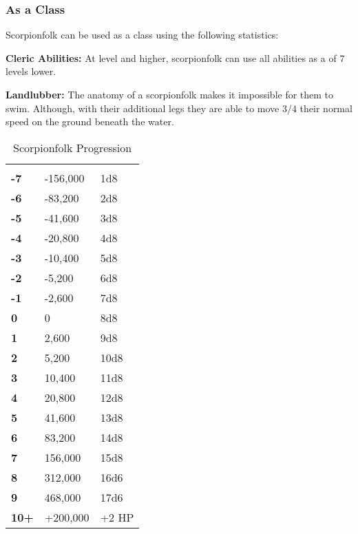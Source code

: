\begin{multicols*}{2}
\subsubsection{As a Class}
Scorpionfolk can be used as a class using the following statistics:

\textbf{Cleric Abilities:} At  level and higher, scorpionfolk can use all  abilities as a  of 7 levels lower.

\textbf{Landlubber:} The anatomy of a scorpionfolk makes it impossible for them to swim. Although, with their additional legs they are able to move 3/4 their normal speed on the ground beneath the water.


\begin {table}[H]
  \caption{Scorpionfolk Progression}
  \begin{tabularx}{\columnwidth}{>{\bfseries}YYY}
   &  & \\
	-7 & -156,000 & 1d8\\
	-6 & -83,200 & 2d8\\
	-5 & -41,600 & 3d8\\
	-4 & -20,800 & 4d8\\
	-3 & -10,400 & 5d8\\
	-2 & -5,200 & 6d8\\
	-1 & -2,600 & 7d8\\
	0 & 0 & 8d8\\
	1 & 2,600 & 9d8\\
	2 & 5,200 & 10d8\\
	3 & 10,400 & 11d8\\
	4 & 20,800 & 12d8\\
	5 & 41,600 & 13d8\\
	6 & 83,200 & 14d8\\
	7 & 156,000 & 15d8\\
	8 & 312,000 & 16d6\\
	9 & 468,000 & 17d6\\
	10+ & +200,000 & +2 HP
  \end {tabularx}
\end {table}


\end{multicols*}
